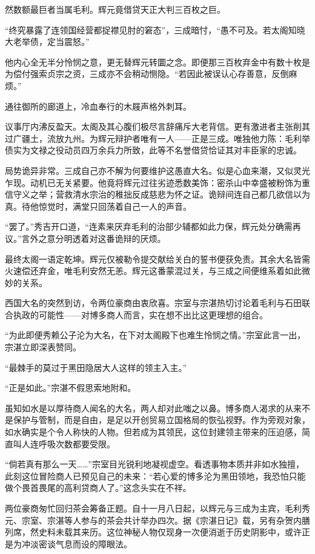 \documentclass[
]{article}
\begin{document}
然数额最巨者当属毛利。辉元竟借贷天正大判三百枚之巨。

``终究暴露了连领国经营都捉襟见肘的窘态''，三成暗忖，``愚不可及。若太阁知晓大老举债，定当震怒。''

他内心全无半分怜悯之意，更无替辉元转圜之念。即便那三百枚弃金中有数十枚是为偿付强索贞宗之资，三成亦不会稍动恻隐。``若因此被误认心存善意，反倒麻烦。''

通往御所的廊道上，冷血奉行的木屐声格外刺耳。

议事厅内沸反盈天。太阁及其心腹们极尽言辞痛斥大老背信。更有激进者主张削其过广疆土，流放九州。为辉元辩护者唯有一人------正是三成。唯独他力陈：毛利举债实为文禄之役动员四万余兵力所致，此等不名誉借贷恰证其对丰臣家的忠诚。

局势诡异非常。三成自己亦不解为何要维护这愚直大名。似是心血来潮，又似灵光乍现。动机已无关紧要。他竟将辉元过往劣迹悉数美饰：密杀山中幸盛被粉饰为重信守义之举；营救清水宗治的稚拙反成慈悲为怀之证。诡辩间连自己都几欲信以为真。待他惊觉时，满堂只回荡着自己一人的声音。

``罢了。''秀吉开口道，``连素来厌弃毛利的治部少辅都如此力保，辉元处分确需再议。''言外之意分明透着对这番诡辩的厌烦。

最终太阁一语定乾坤。辉元仅被勒令提交献给关白的誓书便获免责。其余大名皆需火速偿还弃金，唯毛利安然无恙。辉元这番蒙混过关，与三成之间便维系着如此微妙的关系。

西国大名的突然到访，令两位豪商由衷欣喜。宗室与宗湛热切讨论着毛利与石田联合执政的可能性------对博多商人而言，实在想不出比这更理想的组合。

``为此即便秀赖公子沦为大名，在下对太阁殿下也难生怜悯之情。''宗室此言一出，宗湛立即深表赞同。

``最棘手的莫过于黑田隐居大人这样的领主入主。''

``正是如此。''宗湛不假思索地附和。

虽知如水是以厚待商人闻名的大名，两人却对此嗤之以鼻。博多商人渴求的从来不是保护与管制，而是自由，是足以开创贸易立国格局的恢弘视野。作为旁观对象，如水确实是个令人称快的人物。但若成为其领民，这位封建领主带来的压迫感，简直叫人连呼吸次数都要受限。

``倘若真有那么一天\ldots\ldots{}''宗室目光锐利地凝视虚空。看透事物本质并非如水独擅，此刻这位冒险商人已预见自己的未来：``若心爱的博多沦为黑田领地，我恐怕只能做个畏首畏尾的高利贷商人了。''这念头实在不祥。

两位豪商匆忙回归茶会筹备正题。自十一月八日起，以辉元与三成为主宾，毛利秀元、宗室、宗湛等人参与的茶会共计举办四次。据《宗湛日记》载，另有杂贺内膳列席，然史料未载其来历。这位神秘人物仅现身一次便消逝于历史阴影中，或许正是为冲淡密谈气息而设的障眼法。
\end{document}
